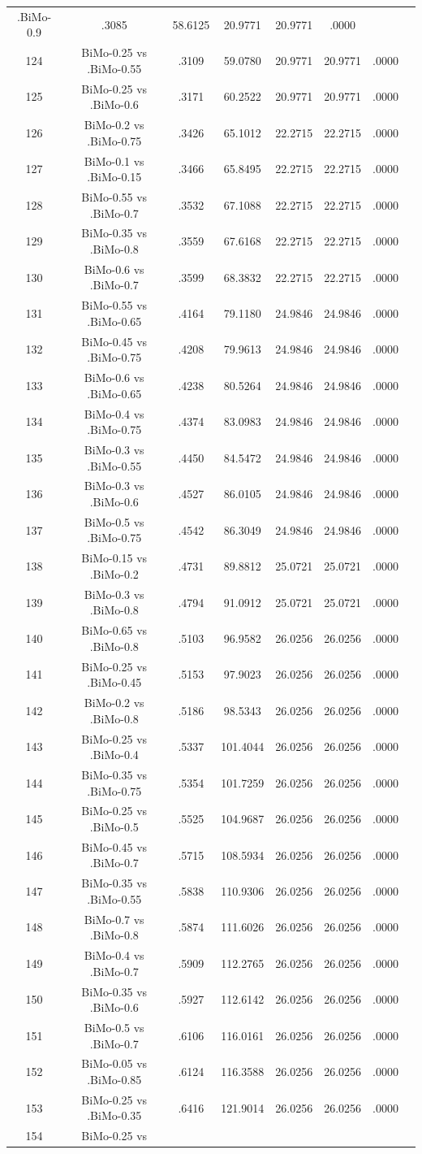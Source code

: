 \documentclass[a4paper,10pt]{article}
\begin{document}
\begin{landscape}
\begin{table}[!htp]
\begin{tabular}{cccccccc}
.BiMo-0.9&.3085&58.6125&20.9771&20.9771&.0000\\124&BiMo-0.25 vs .BiMo-0.55&.3109&59.0780&20.9771&20.9771&.0000\\125&BiMo-0.25 vs .BiMo-0.6&.3171&60.2522&20.9771&20.9771&.0000\\126&BiMo-0.2 vs .BiMo-0.75&.3426&65.1012&22.2715&22.2715&.0000\\127&BiMo-0.1 vs .BiMo-0.15&.3466&65.8495&22.2715&22.2715&.0000\\128&BiMo-0.55 vs .BiMo-0.7&.3532&67.1088&22.2715&22.2715&.0000\\129&BiMo-0.35 vs .BiMo-0.8&.3559&67.6168&22.2715&22.2715&.0000\\130&BiMo-0.6 vs .BiMo-0.7&.3599&68.3832&22.2715&22.2715&.0000\\131&BiMo-0.55 vs .BiMo-0.65&.4164&79.1180&24.9846&24.9846&.0000\\132&BiMo-0.45 vs .BiMo-0.75&.4208&79.9613&24.9846&24.9846&.0000\\133&BiMo-0.6 vs .BiMo-0.65&.4238&80.5264&24.9846&24.9846&.0000\\134&BiMo-0.4 vs .BiMo-0.75&.4374&83.0983&24.9846&24.9846&.0000\\135&BiMo-0.3 vs .BiMo-0.55&.4450&84.5472&24.9846&24.9846&.0000\\136&BiMo-0.3 vs .BiMo-0.6&.4527&86.0105&24.9846&24.9846&.0000\\137&BiMo-0.5 vs .BiMo-0.75&.4542&86.3049&24.9846&24.9846&.0000\\138&BiMo-0.15 vs .BiMo-0.2&.4731&89.8812&25.0721&25.0721&.0000\\139&BiMo-0.3 vs .BiMo-0.8&.4794&91.0912&25.0721&25.0721&.0000\\140&BiMo-0.65 vs .BiMo-0.8&.5103&96.9582&26.0256&26.0256&.0000\\141&BiMo-0.25 vs .BiMo-0.45&.5153&97.9023&26.0256&26.0256&.0000\\142&BiMo-0.2 vs .BiMo-0.8&.5186&98.5343&26.0256&26.0256&.0000\\143&BiMo-0.25 vs .BiMo-0.4&.5337&101.4044&26.0256&26.0256&.0000\\144&BiMo-0.35 vs .BiMo-0.75&.5354&101.7259&26.0256&26.0256&.0000\\145&BiMo-0.25 vs .BiMo-0.5&.5525&104.9687&26.0256&26.0256&.0000\\146&BiMo-0.45 vs .BiMo-0.7&.5715&108.5934&26.0256&26.0256&.0000\\147&BiMo-0.35 vs .BiMo-0.55&.5838&110.9306&26.0256&26.0256&.0000\\148&BiMo-0.7 vs .BiMo-0.8&.5874&111.6026&26.0256&26.0256&.0000\\149&BiMo-0.4 vs .BiMo-0.7&.5909&112.2765&26.0256&26.0256&.0000\\150&BiMo-0.35 vs .BiMo-0.6&.5927&112.6142&26.0256&26.0256&.0000\\151&BiMo-0.5 vs .BiMo-0.7&.6106&116.0161&26.0256&26.0256&.0000\\152&BiMo-0.05 vs .BiMo-0.85&.6124&116.3588&26.0256&26.0256&.0000\\153&BiMo-0.25 vs .BiMo-0.35&.6416&121.9014&26.0256&26.0256&.0000\\154&BiMo-0.25 vs 
\end{tabular}
\end{table}
\end{landscape}
\end{document}
